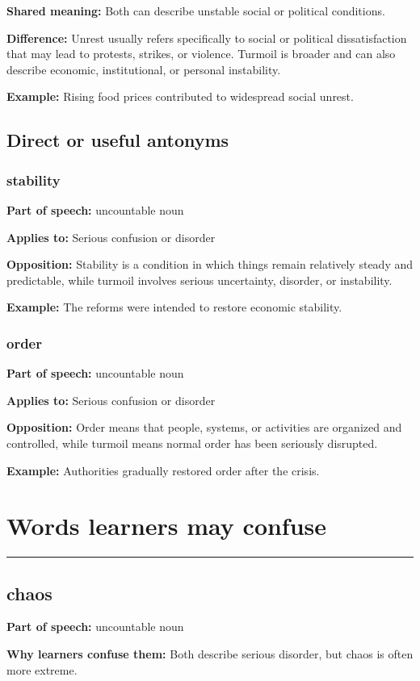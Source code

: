 \documentclass[11pt]{article}
\newcommand{\sectionrule}{\par\vspace{-0.5em}\noindent\textcolor{Accent}{\rule{\linewidth}{0.6pt}}\par}
\begin{document}
\textbf{Shared meaning:} Both can describe unstable social or political conditions.

\textbf{Difference:} Unrest usually refers specifically to social or political dissatisfaction that may lead to protests, strikes, or violence. Turmoil is broader and can also describe economic, institutional, or personal instability.

\textbf{Example:} Rising food prices contributed to widespread social unrest.

\subsection{Direct or useful antonyms}
\subsubsection{stability}
\textbf{Part of speech:} uncountable noun

\textbf{Applies to:} Serious confusion or disorder

\textbf{Opposition:} Stability is a condition in which things remain relatively steady and predictable, while turmoil involves serious uncertainty, disorder, or instability.

\textbf{Example:} The reforms were intended to restore economic stability.

\subsubsection{order}
\textbf{Part of speech:} uncountable noun

\textbf{Applies to:} Serious confusion or disorder

\textbf{Opposition:} Order means that people, systems, or activities are organized and controlled, while turmoil means normal order has been seriously disrupted.

\textbf{Example:} Authorities gradually restored order after the crisis.

\section{Words learners may confuse}
\sectionrule
\subsection{chaos}
\textbf{Part of speech:} uncountable noun

\textbf{Why learners confuse them:} Both describe serious disorder, but chaos is often more extreme.
\end{document}
